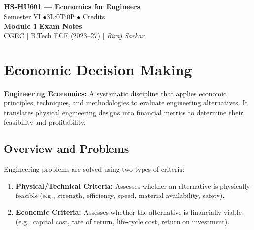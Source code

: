 \documentclass[12pt,a4paper]{article}
\begin{document}

\begin{center}
  {\LARGE\bfseries\color{myred} HS-HU601 --- Economics for Engineers}\\[5pt]
  {\normalsize\color{mydark} Semester VI \quad$\bullet$\quad 3L:0T:0P \quad$\bullet$ Credits}\\[3pt]
  {\normalsize\color{myteal}\textbf{Module 1 Exam Notes}}\\[3pt]
  {\small\color{mydark} CGEC \;$|$\; B.Tech ECE (2023--27) \;$|$\; \textit{Biraj Sarkar}}
\end{center}
\vspace{2pt}
\noindent{\color{myred}\rule{\linewidth}{1.5pt}}
\vspace{2pt}

\hypersetup{linkcolor=mydark}
\tableofcontents
\hypersetup{linkcolor=myteal}
\newpage

\section{Economic Decision Making}

\begin{tcolorbox}[defbox]
\textbf{Engineering Economics:} A systematic discipline that applies economic principles, techniques, and methodologies to evaluate engineering alternatives. It translates physical engineering designs into financial metrics to determine their feasibility and profitability.
\end{tcolorbox}

\subsection{Overview and Problems}
Engineering problems are solved using two types of criteria:
\begin{enumerate}[label=\textbf{\arabic*.}, leftmargin=*, itemsep=3pt, topsep=2pt]
  \item \textbf{Physical/Technical Criteria:} Assesses whether an alternative is physically feasible (e.g., strength, efficiency, speed, material availability, safety).
  \item \textbf{Economic Criteria:} Assesses whether the alternative is financially viable (e.g., capital cost, rate of return, life-cycle cost, return on investment).
\end{enumerate}
\end{document}
